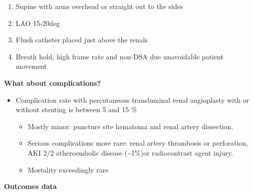 \documentclass[
]{book}
\begin{document}
\begin{itemize}
\begin{itemize}
    \begin{enumerate}
    \def\labelenumi{\arabic{enumi}.}
    \item
      Supine with arms overhead or straight out to the sides
    \item
      LAO 15-20deg
    \item
      Flush catheter placed just above the renals
    \item
      Breath hold, high frame rate and non-DSA due unavoidable
      patient movement
    \end{enumerate}
  \end{itemize}
\end{itemize}

\textbf{What about complications?}

\begin{itemize}
\item
  Complication rate with percutaneous transluminal renal angioplasty
  with or without stenting is between 5 and 15 \%

  \begin{itemize}
  \item
    Mostly minor: puncture site hematoma and renal artery
    dissection.
  \item
    Serious complications more rare: renal artery thrombosis or
    perforation, AKI 2/2 atheroembolic disease (\textasciitilde1\%)or
    radiocontrast agent injury.
  \item
    Mortality exceedingly rare
  \end{itemize}
\end{itemize}

\textbf{Outcomes data}
\end{document}

